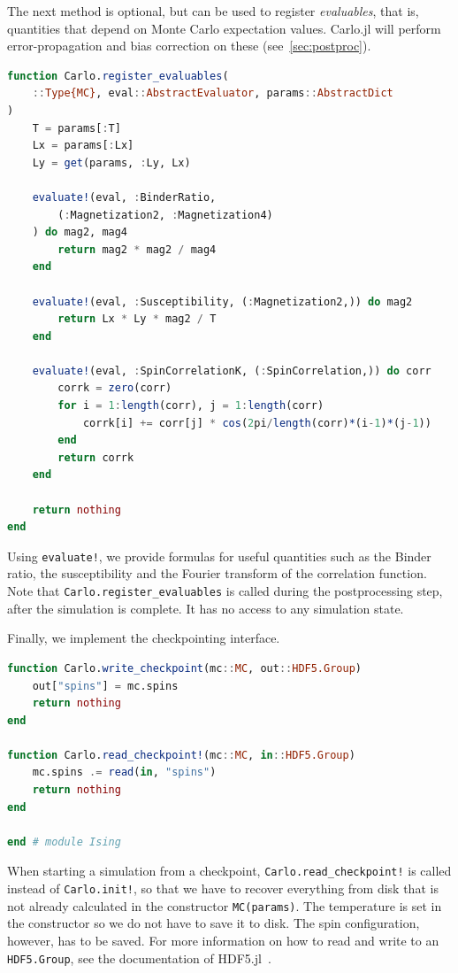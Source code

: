 \documentclass{SciPost}
\begin{document}
The next method is optional, but can be used to register \textit{evaluables}, that is, quantities that depend on Monte Carlo expectation values. Carlo.jl will perform error-propagation and bias correction on these (see~\cref{sec:postproc}).
\begin{lstlisting}[language=julia]
function Carlo.register_evaluables(
	::Type{MC}, eval::AbstractEvaluator, params::AbstractDict
)
    T = params[:T]
    Lx = params[:Lx]
    Ly = get(params, :Ly, Lx)

    evaluate!(eval, :BinderRatio,
        (:Magnetization2, :Magnetization4)
    ) do mag2, mag4
        return mag2 * mag2 / mag4
    end

    evaluate!(eval, :Susceptibility, (:Magnetization2,)) do mag2
        return Lx * Ly * mag2 / T
    end

    evaluate!(eval, :SpinCorrelationK, (:SpinCorrelation,)) do corr
        corrk = zero(corr)
        for i = 1:length(corr), j = 1:length(corr)
            corrk[i] += corr[j] * cos(2pi/length(corr)*(i-1)*(j-1))
        end
        return corrk
    end

    return nothing
end
\end{lstlisting}
Using \texttt{evaluate!}, we provide formulas for useful quantities such as the Binder ratio, the susceptibility and the Fourier transform of the correlation function. Note that \texttt{Carlo.register\_{}evaluables} is called during the postprocessing step, after the simulation is complete. It has no access to any simulation state.

Finally, we implement the checkpointing interface.
\begin{lstlisting}[language=julia]
function Carlo.write_checkpoint(mc::MC, out::HDF5.Group)
    out["spins"] = mc.spins
    return nothing
end

function Carlo.read_checkpoint!(mc::MC, in::HDF5.Group)
    mc.spins .= read(in, "spins")
    return nothing
end

end # module Ising
\end{lstlisting}
When starting a simulation from a checkpoint, \texttt{Carlo.read\_{}checkpoint!} is called instead of \texttt{Carlo.init!}, so that we have to recover everything from disk that is not already calculated in the constructor \texttt{MC(params)}. The temperature is set in the constructor so we do not have to save it to disk. The spin configuration, however, has to be saved. For more information on how to read and write to an \texttt{HDF5.Group}, see the documentation of HDF5.jl~\cite{HDF5}.
\end{document}
